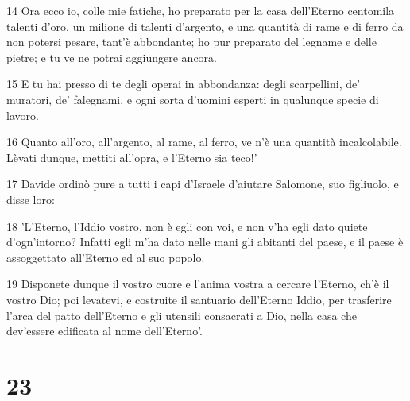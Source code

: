 \par 14 Ora ecco io, colle mie fatiche, ho preparato per la casa dell'Eterno centomila talenti d'oro, un milione di talenti d'argento, e una quantità di rame e di ferro da non potersi pesare, tant'è abbondante; ho pur preparato del legname e delle pietre; e tu ve ne potrai aggiungere ancora.
\par 15 E tu hai presso di te degli operai in abbondanza: degli scarpellini, de' muratori, de' falegnami, e ogni sorta d'uomini esperti in qualunque specie di lavoro.
\par 16 Quanto all'oro, all'argento, al rame, al ferro, ve n'è una quantità incalcolabile. Lèvati dunque, mettiti all'opra, e l'Eterno sia teco!'
\par 17 Davide ordinò pure a tutti i capi d'Israele d'aiutare Salomone, suo figliuolo, e disse loro:
\par 18 'L'Eterno, l'Iddio vostro, non è egli con voi, e non v'ha egli dato quiete d'ogn'intorno? Infatti egli m'ha dato nelle mani gli abitanti del paese, e il paese è assoggettato all'Eterno ed al suo popolo.
\par 19 Disponete dunque il vostro cuore e l'anima vostra a cercare l'Eterno, ch'è il vostro Dio; poi levatevi, e costruite il santuario dell'Eterno Iddio, per trasferire l'arca del patto dell'Eterno e gli utensili consacrati a Dio, nella casa che dev'essere edificata al nome dell'Eterno'.

\chapter{23}

